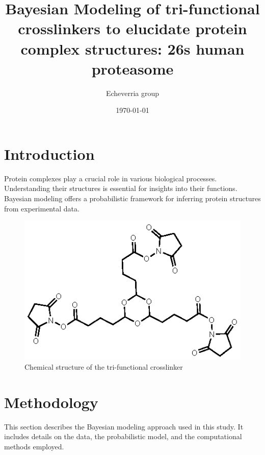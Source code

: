 \documentclass{report}
\begin{document}
\title{Bayesian Modeling of tri-functional crosslinkers to 
elucidate protein complex structures: 26s human proteasome}
\author{Echeverria group}
\date{\today}
\maketitle

\tableofcontents

\chapter{Introduction}
\label{chap:introduction}
Protein complexes play a crucial role in various biological processes. 
Understanding their structures is essential for insights into their functions. 
Bayesian modeling offers a probabilistic framework for inferring protein structures 
from experimental data.
\begin{figure}
\centering
\includegraphics[scale=1.0]{./figures/tri-linker.eps}
\caption{Chemical structure of the tri-functional crosslinker}
\end{figure}

\chapter{Methodology}
\label{chap:methodology}
This section describes the Bayesian modeling approach used in this study. 
It includes details on the data, the probabilistic model, and the 
computational methods employed.
\end{document}
